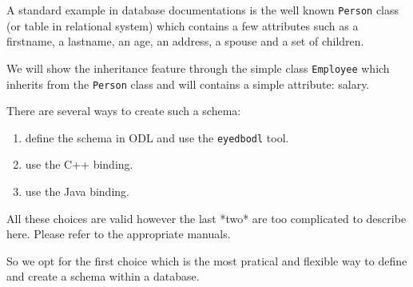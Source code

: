 A standard example in database documentations is the well known
\texttt{Person} class (or table in relational system) which contains
a few attributes such as a firstname, a lastname, an age, an address, a spouse
and a set of children.

We will show the inheritance feature through the simple class \texttt{Employee}
which inherits from the \texttt{Person} class and will contains a simple
attribute: salary.


There are several ways to create such a schema:
\begin{enumerate}
\item define the schema in ODL and use the \texttt{eyedbodl} tool. 
\item use the C++ binding. 
\item use the Java binding. 
\end{enumerate}

All these choices are valid however the last *two* are too complicated
to describe here. Please refer to the appropriate manuals.


So we opt for the first choice which is the most pratical
and flexible way to define and create a schema within a database.


